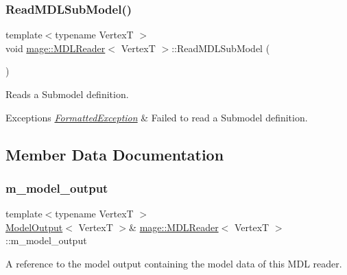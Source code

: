 \subsubsection{\texorpdfstring{Read\+M\+D\+L\+Sub\+Model()}{ReadMDLSubModel()}}
{\footnotesize\ttfamily template$<$typename VertexT $>$ \\
void \hyperlink{classmage_1_1_m_d_l_reader}{mage\+::\+M\+D\+L\+Reader}$<$ VertexT $>$\+::Read\+M\+D\+L\+Sub\+Model (\begin{DoxyParamCaption}{ }\end{DoxyParamCaption})\hspace{0.3cm}{\ttfamily [private]}}

Reads a Submodel definition.


\begin{DoxyExceptions}{Exceptions}
{\em \hyperlink{classmage_1_1_formatted_exception}{Formatted\+Exception}} & Failed to read a Submodel definition. \\
\hline
\end{DoxyExceptions}


\subsection{Member Data Documentation}
\hypertarget{classmage_1_1_m_d_l_reader_a41392308792749b78657497b69add850}{}\label{classmage_1_1_m_d_l_reader_a41392308792749b78657497b69add850} 
\subsubsection{\texorpdfstring{m\+\_\+model\+\_\+output}{m\_model\_output}}
{\footnotesize\ttfamily template$<$typename VertexT $>$ \\
\hyperlink{structmage_1_1_model_output}{Model\+Output}$<$ VertexT $>$\& \hyperlink{classmage_1_1_m_d_l_reader}{mage\+::\+M\+D\+L\+Reader}$<$ VertexT $>$\+::m\+\_\+model\+\_\+output\hspace{0.3cm}{\ttfamily [private]}}

A reference to the model output containing the model data of this M\+DL reader. 